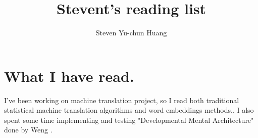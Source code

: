 \documentclass[a4paper]{article}
\title{\textbf{Stevent's reading list}}
\author{Steven Yu-chun Huang}
\begin{document}
\maketitle

\section{What I have read.}
I've been working on machine translation project, so I read both traditional statistical machine translation algorithms and word embeddings methods.\cite{Auli2013, Bengio2003, Collobert2011, Devlin2014, Hu2014, Huang2012, Koehn2007, Mikolov2010, Mikolov2013, Turian2010, Zou2013, Frome2013, Norouzi2014, Schmidhuber2014}.
I also spent some time implementing and testing "Developmental Mental Architecture" done by Weng \cite{Weng2008, Weng2009, Weng2009a, Weng2013}.

 

\end{document}
